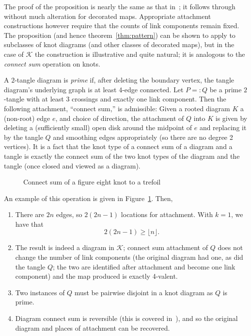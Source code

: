 \documentclass[submission%
]{dmtcs}
\newcommand{\KnotDiaClass}{\mathscr{K}}
\begin{document}
The proof of the proposition is nearly the same as that
in~\cite{Bender1992104}; it follows through without much alteration
for decorated maps. Appropriate attachment constructions however
require that the counts of link components remain fixed. The
proposition (and hence theorem~\ref{thm:pattern}) can be shown to
apply to subclasses of knot diagrams (and other classes of decorated
maps), but in the case of $\KnotDiaClass$ the construction is
illustrative and quite natural; it is analogous to the \emph{connect
  sum} operation on knots.

A $2$-tangle diagram is \emph{prime} if, after deleting the boundary
vertex, the tangle diagram's underlying graph is at least 4-edge
connected. Let $P =: Q$ be a prime $2$-tangle with at least $3$
crossings and exactly one link component. Then the following
attachment, ``connect sum,'' is admissible: Given a rooted diagram $K$
a (non-root) edge $e$, and choice of direction, the attachment of $Q$
into $K$ is given by deleting a (sufficiently small) open disk around
the midpoint of $e$ and replacing it by the tangle $Q$ and smoothing
edges appropriately (so there are no degree 2 vertices). It is a fact
that the knot type of a connect sum of a diagram and a tangle is
exactly the connect sum of the two knot types of the diagram and the
tangle (once closed and viewed as a diagram).
\begin{figure}[hbtp]
  \centering
  \hfil
  \hfil
  \caption{Connect sum of a figure eight knot to a trefoil}
  \label{fig:csexample}
\end{figure}
An example of
this operation is given in Figure~\ref{fig:csexample}. Then,
\begin{enumerate}
\item There are $2n$ edges, so $2(2n-1)$ locations for
  attachment. With $k = 1$, we have that
  \begin{displaymath}
    2(2n-1) \ge \lfloor n \rfloor.
  \end{displaymath}
\item The result is indeed a diagram in $\KnotDiaClass$; connect sum
  attachment of $Q$ does not change the number of link components (the
  original diagram had one, as did the tangle $Q$; the two are
  identified after attachment and become one link component) and the
  map produced is exactly 4-valent.
\item Two instances of $Q$ must be pairwise disjoint in a knot diagram
  as $Q$ is prime.
\item Diagram connect sum is reversible (this is covered
  in~\cite{CCMknotdiagrams2015}), and so the original diagram and
  places of attachment can be recovered.
\end{enumerate}
\end{document}
